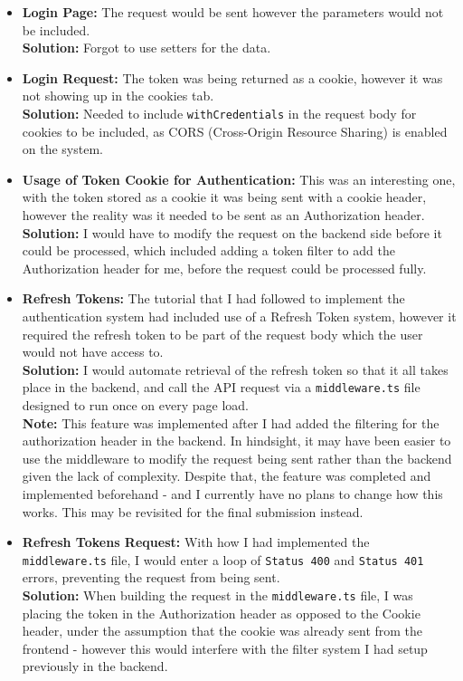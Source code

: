 \documentclass[]{final_report}
\begin{document}
\begin{itemize}
	\item \textbf{Login Page:} The request would be sent however the parameters would not be included.\\ \textbf{Solution:} Forgot to use setters for the data.
	
	\item \textbf{Login Request:} The token was being returned as a cookie, however it was not showing up in the cookies tab.\\ \textbf{Solution:} Needed to include \verb|withCredentials| in the request body for cookies to be included, as CORS (Cross-Origin Resource Sharing) is enabled on the system.
	
	\item \textbf{Usage of Token Cookie for Authentication:} This was an interesting one, with the token stored as a cookie it was being sent with a cookie header, however the reality was it needed to be sent as an Authorization header.\\ \textbf{Solution:} I would have to modify the request on the backend side before it could be processed, which included adding a token filter to add the Authorization header for me, before the request could be processed fully.
	
	\item \textbf{Refresh Tokens:} The tutorial that I had followed to implement the authentication system had included use of a Refresh Token system, however it required the refresh token to be part of the request body which the user would not have access to.\\ \textbf{Solution:} I would automate retrieval of the refresh token so that it all takes place in the backend, and call the API request via a \verb|middleware.ts| file designed to run once on every page load. \\ \textbf{Note:} This feature was implemented after I had added the filtering for the authorization header in the backend. In hindsight, it may have been easier to use the middleware to modify the request being sent rather than the backend given the lack of complexity. Despite that, the feature was completed and implemented beforehand - and I currently have no plans to change how this works. This may be revisited for the final submission instead.
	
	\item \textbf{Refresh Tokens Request:} With how I had implemented the \verb|middleware.ts| file, I would enter a loop of \verb|Status 400| and \verb|Status 401| errors, preventing the request from being sent. \\ \textbf{Solution:} When building the request in the \verb|middleware.ts| file, I was placing the token in the Authorization header as opposed to the Cookie header, under the assumption that the cookie was already sent from the frontend - however this would interfere with the filter system I had setup previously in the backend.
	

\end{itemize}
\end{document}
